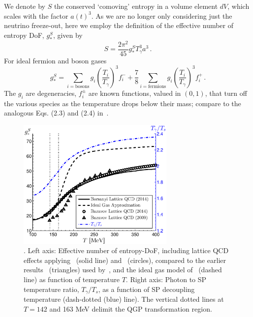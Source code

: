 We denote by $S$ the conserved `comoving' entropy in a volume element $dV$, which scales with the factor $a(t)^3$. As we are no longer only considering just the neutrino freeze-out, here we employ the definition of the effective number of entropy DoF, $g_*^S$, given by
\begin{equation}
S=\frac{2\pi^2}{45}g^S_*T_\gamma^3 a^3\,.
\end{equation} 
For ideal fermion and boson gases
\begin{equation}
g_*^S=\!\!\!\!\sum_{i=\text{bosons}}\!\!\!\!g_i \left(\frac{T_i}{T_\gamma}\right)^3\!\!\!f_i^-+\frac{7}{8}\!\!\!\sum_{i=\text{fermions}}\!\!\!\! g_i \left(\frac{T_i}{T_\gamma}\right)^3\!\!\!f_i^+\,.
\end{equation}
The $g_i$ are degeneracies, $f_i^\pm$ are known functions, valued in $(0,1)$, that turn off the various species as the temperature drops below their mass; compare to the analogous Eqs. (2.3) and (2.4) in~\cite{Blennow:2012de}. 


\begin{figure}\label{fig:gs}
\centering
\begin{minipage}[b]{.49\textwidth}
\centerline{\hspace*{-0.10cm}\includegraphics[height=6.4cm]{04-birrell/ModelIndStudy/Figures/gS_T_ratio.eps}}
\end{minipage}
\caption{. Left axis: Effective number of entropy-DoF, including lattice QCD effects applying~\cite{Borsanyi:2013bia} (solid line) and~\cite{HotQCD:2014kol} (circles), compared to the earlier results~\cite{Bazavov:2009zn} (triangles) used by~\cite{Anchordoqui:2011nh}, and the ideal gas model of~\cite{Coleman:2003hs} (dashed line) as function of temperature $T$. Right axis: Photon to SP temperature ratio, $T_\gamma/T_s$, as a function of SP decoupling temperature (dash-dotted (blue) line). The vertical dotted lines at $T=142$ and 163 MeV delimit the QGP transformation region.\label{fig:gS}}
 \end{figure}

